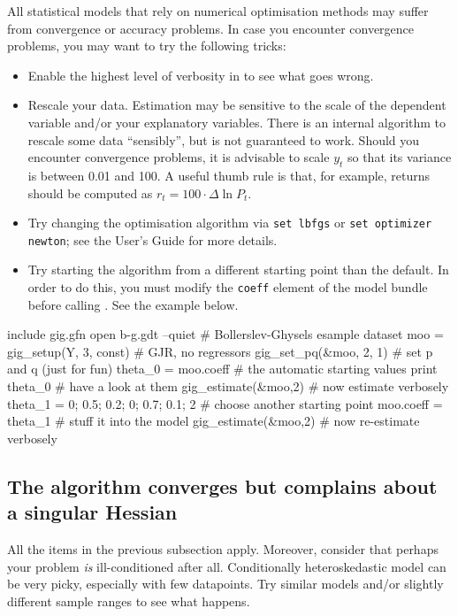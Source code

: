 \documentclass[a4paper,11pt]{article}
\newcommand{\dtk}[1]{\texttt{\detokenize{#1}}}
\begin{document}
All statistical models that rely on numerical optimisation methods may
suffer from convergence or accuracy problems. In case you encounter
convergence problems, you may want to try the following tricks:
\begin{itemize}
\item Enable the highest level of verbosity in
  \dtk{gig_estimate()} to see what goes wrong.
\item Rescale your data. Estimation may be sensitive to the scale of
  the dependent variable and/or your explanatory variables. There is
  an internal algorithm to rescale some data ``sensibly'', but is not
  guaranteed to work. Should you encounter convergence problems, it is
  advisable to scale $y_t$ so that its variance is between 0.01 and
  100. A useful thumb rule is that, for example, returns should be
  computed as $r_t = 100 \cdot \Delta \ln P_t$.
\item Try changing the optimisation algorithm via \texttt{set lbfgs}
  or \texttt{set optimizer newton}; see the User's Guide for more details.
\item Try starting the algorithm from a different starting point than
  the default. In order to do this, you must modify the \texttt{coeff}
  element of the model bundle before calling
  \dtk{gig_estimate}. See the example below.
\end{itemize}


\begin{scode}
include gig.gfn
open b-g.gdt --quiet                    # Bollerslev-Ghysels esample dataset
moo = gig_setup(Y, 3, const)            # GJR, no regressors
gig_set_pq(&moo, 2, 1)                  # set p and q (just for fun)
theta_0 = moo.coeff                     # the automatic starting values
print theta_0                           # have a look at them
gig_estimate(&moo,2)                    # now estimate verbosely
theta_1 = {0; 0.5; 0.2; 0; 0.7; 0.1; 2} # choose another starting point
moo.coeff = theta_1                     # stuff it into the model
gig_estimate(&moo,2)                    # now re-estimate verbosely
\end{scode}

\subsection{The algorithm converges but complains about a singular
  Hessian}

All the items in the previous subsection apply. Moreover, consider
that perhaps your problem \emph{is} ill-conditioned after
all. Conditionally heteroskedastic model can be very picky, especially
with few datapoints. Try similar models and/or slightly different
sample ranges to see what happens.
\end{document}
